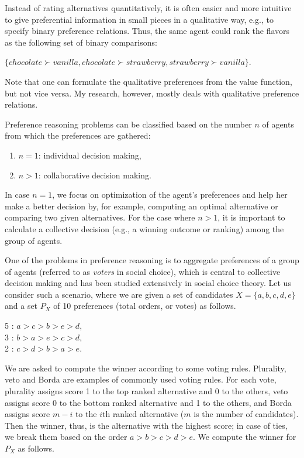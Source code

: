 Instead of rating alternatives quantitatively, it is
often easier and more intuitive to give preferential information
in small pieces in a qualitative way,
e.g., to specify binary preference relations.
Thus, the same agent could rank the flavors as the following
set of binary comparisons:
\begin{center}
	$\{chocolate \succ vanilla, chocolate \succ strawberry,
	strawberry \succ vanilla\}$.
\end{center}
Note that one can formulate the qualitative preferences from
the value function, but not vice versa.
My research, however, mostly deals with qualitative preference relations.

Preference reasoning problems can be classified
based on the number $n$ of agents from which the preferences are gathered:
\begin{enumerate} \itemsep -4pt
	\item $n=1$: individual decision making,
	\item $n>1$: collaborative decision making.
\end{enumerate}
In case $n=1$, we focus on optimization of the agent's preferences and
help her make a better decision by, for example, computing an optimal
alternative or comparing two given alternatives.  For the case
where $n>1$, it is important to calculate
a collective decision (e.g., a winning outcome or ranking)
among the group of agents.

One of the problems in preference reasoning is to
aggregate preferences of a group of
agents (referred
to as \emph{voters} in social choice), which is central to collective decision making and has been studied
extensively in social choice theory. 
Let us consider such a scenario, where we are
given a set of candidates $X = \{ a,b,c,d,e \}$ and a set $P_X$ of 10 
preferences (total orders, or votes) as follows.
	\begin{center}
		5 : $a > c > b > e > d$,\\
		3 : $b > a > e > c > d$,\\
		2 : $c > d > b > a > e$.
	\end{center}
	
	We are asked to compute the winner according to some voting rules. 
	Plurality, veto and Borda are examples of commonly used voting rules.
	For each vote, plurality assigns score 1 to the top ranked alternative
	and 0 to the others, veto assigns score 0 to the bottom ranked alternative
	and 1 to the others, and Borda assigns score $m-i$ to the $i$th ranked 
	alternative ($m$ is the number of candidates).
	Then the winner, thus, is the alternative with the highest score; in case of
	ties, we break them based on the order $a > b > c > d > e$.
	We compute the winner for $P_X$ as follows.
	
